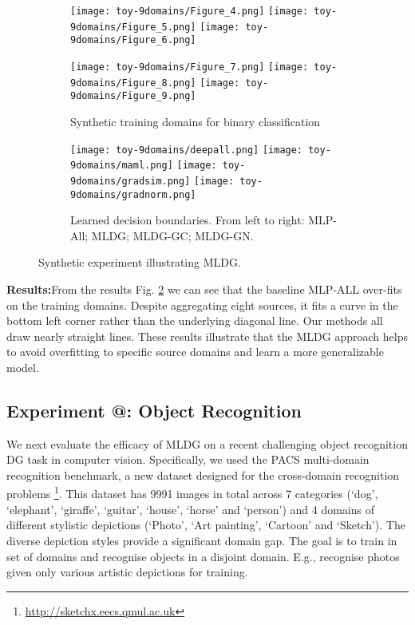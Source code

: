 \documentclass[letterpaper]{article} \usepackage{aaai18}  \usepackage{times}  \usepackage{helvet}  \usepackage{courier}  \usepackage{url}  \usepackage{graphicx}  \usepackage{amsmath}
\makeatletter
\newcommand*{\rom}[1]{\expandafter\@slowromancap\romannumeral #1@}
\makeatother
\begin{document}
{\begin{figure}[t]
\begin{subfigure}{1.0\columnwidth}
\texttt{[image: toy-9domains/Figure\_4.png]}
\texttt{[image: toy-9domains/Figure\_5.png]}
\texttt{[image: toy-9domains/Figure\_6.png]}

\texttt{[image: toy-9domains/Figure\_7.png]}
\texttt{[image: toy-9domains/Figure\_8.png]}
\texttt{[image: toy-9domains/Figure\_9.png]}
\caption{Synthetic training domains for binary classification}
\label{toy}
\end{subfigure}
\begin{subfigure}{1.0\columnwidth}
\centering
\texttt{[image: toy-9domains/deepall.png]}
\texttt{[image: toy-9domains/maml.png]}
\texttt{[image: toy-9domains/gradsim.png]}
\texttt{[image: toy-9domains/gradnorm.png]}
\caption{Learned decision boundaries. From left to right: MLP-All; MLDG; MLDG-GC; MLDG-GN.}
\end{subfigure}
\caption{Synthetic experiment illustrating MLDG.}
\label{toy-res}
\end{figure}


\vspace{0.1cm}\noindent \textbf{Results:}\quad From the results Fig. \ref{toy-res} we can see that the baseline MLP-ALL over-fits on the training domains.  Despite aggregating eight sources, it fits a curve in the bottom left corner rather than the underlying diagonal line. Our methods all draw nearly straight lines. 
These results illustrate that the MLDG approach helps to avoid overfitting to specific source domains and learn a more generalizable model.




\subsection{Experiment \rom{2}: Object Recognition}
We next evaluate the efficacy of MLDG on a recent challenging object recognition DG task in computer vision. Specifically, we used the PACS multi-domain recognition benchmark, a new dataset designed for the cross-domain recognition problems \cite{da2017dg}\footnote{\url{http://sketchx.eecs.qmul.ac.uk}}. This dataset has 9991 images in total across 7 categories (`dog', `elephant', `giraffe', `guitar', `house', `horse' and `person') and 4 domains of different stylistic depictions (`Photo', `Art painting', `Cartoon' and `Sketch'). The diverse depiction styles provide a significant domain gap. The goal is to train in set of domains and recognise objects in a disjoint domain. E.g., recognise photos given only various artistic depictions for training.



}
\end{document}
